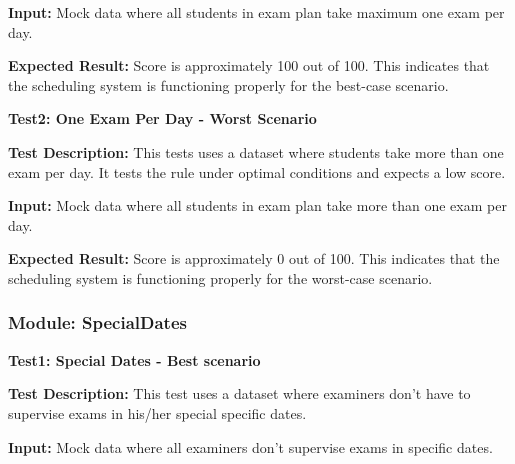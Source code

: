 \textbf{Input:}
 Mock data where all students in exam plan take maximum one exam per day.


\vspace{\baselineskip}

\textbf{Expected Result:}
Score is approximately 100 out of 100. This indicates that the scheduling
system is functioning properly for the best-case scenario.



\vspace{\baselineskip}


 
\textbf{Test2: One Exam Per Day - Worst Scenario}


\vspace{\baselineskip}

 
 \textbf{Test Description:}
This tests uses a dataset where students take more than one exam per
day. It tests the rule under optimal conditions and expects a low score.

\vspace{\baselineskip}

\textbf{Input:}
Mock data where all students in exam plan take more than one exam per day.


\vspace{\baselineskip}

 
 \textbf{Expected Result:}
Score is approximately 0 out of 100. This indicates that the scheduling
system is functioning properly for the worst-case scenario.


\vspace{\baselineskip}

\subsubsection{Module: SpecialDates}

 
\vspace{\baselineskip}

 
\textbf{Test1: Special Dates - Best scenario}


\vspace{\baselineskip}

 
 \textbf{Test Description:}
This test uses a dataset where examiners don’t have to supervise exams
in his/her special specific dates.


\vspace{\baselineskip}

\textbf{Input:}
Mock data where all examiners don’t supervise exams in specific dates.



